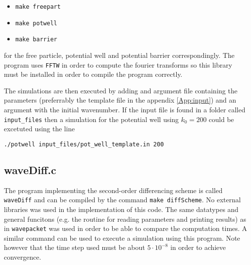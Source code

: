 \begin{itemize}
  \item \verb|make freepart|
  \item \verb|make potwell|
  \item \verb|make barrier|
\end{itemize}

for the free particle, potential well and potential barrier correspondingly. The program uses \verb|FFTW| in order to compute the fourier transforms so this library must be installed in order to compile the program correctly.

The simulations are then executed by adding and argument file containing the parameters (preferrably the template file in the appendix \ref{App:input}) and an argument with the initial wavenumber. If the input file is found in a folder called \verb|input_files| then a simulation for the potential well using $k_0=200$ could be excetuted using the line

\verb|./potwell input_files/pot_well_template.in 200|

\subsection{waveDiff.c}
\label{sec:diffScheme}

The program implementing the second-order differencing scheme is called \verb|waveDiff| and can be compiled by the command \verb|make diffScheme|. No external libraries was used in the implementation of this code. The same datatypes and general funcitons (e.g. the routine for reading parameters and printing results) as in \verb|wavepacket| was used in order to be able to compare the computation times. A similar command can be used to execute a simulation using this program. Note however that the time step used must be about $5\cdot 10^{-8}$ in order to achieve convergence.
